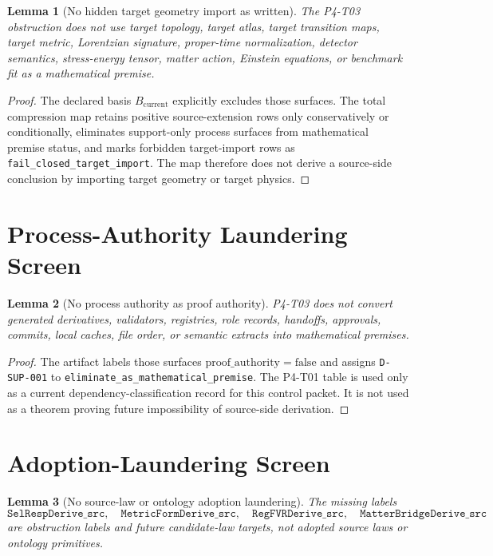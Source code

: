 \documentclass[11pt]{article}
\newcommand{\Bcur}{B_{\mathrm{current}}}
\newcommand{\ProofAuthFalse}{\mathrm{proof\_authority=false}}
\newtheorem{lemma}{Lemma}
\begin{document}
\begin{lemma}[No hidden target geometry import as written]
The P4-T03 obstruction does not use target topology, target atlas, target
transition maps, target metric, Lorentzian signature, proper-time
normalization, detector semantics, stress-energy tensor, matter action,
Einstein equations, or benchmark fit as a mathematical premise.
\end{lemma}

\begin{proof}
The declared basis \(\Bcur\) explicitly excludes those surfaces. The total
compression map retains positive source-extension rows only conservatively or
conditionally, eliminates support-only process surfaces from mathematical
premise status, and marks forbidden target-import rows as
\texttt{fail\_closed\_target\_import}. The map therefore does not derive a
source-side conclusion by importing target geometry or target physics.
\end{proof}

\section{Process-Authority Laundering Screen}

\begin{lemma}[No process authority as proof authority]
P4-T03 does not convert generated derivatives, validators, registries, role
records, handoffs, approvals, commits, local caches, file order, or semantic
extracts into mathematical premises.
\end{lemma}

\begin{proof}
The artifact labels those surfaces \(\ProofAuthFalse\) and assigns
\texttt{D-SUP-001} to
\texttt{eliminate\_as\_mathematical\_premise}. The P4-T01 table is used only
as a current dependency-classification record for this control packet. It is
not used as a theorem proving future impossibility of source-side derivation.
\end{proof}

\section{Adoption-Laundering Screen}

\begin{lemma}[No source-law or ontology adoption laundering]
The missing labels
\[
\texttt{SelRespDerive\_src},\quad
\texttt{MetricFormDerive\_src},\quad
\texttt{RegFVRDerive\_src},\quad
\texttt{MatterBridgeDerive\_src}
\]
are obstruction labels and future candidate-law targets, not adopted source
laws or ontology primitives.
\end{lemma}
\end{document}
